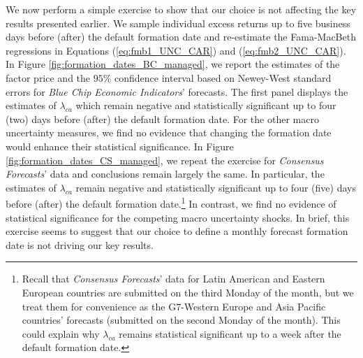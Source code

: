 We now perform a simple exercise to show that our choice is not affecting the key results presented earlier. We sample individual excess returns up to five business days before (after) the default formation date and re-estimate the Fama-MacBeth regressions in Equations (\ref{eq:fmb1_UNC_CAR}) and (\ref{eq:fmb2_UNC_CAR}). In Figure \ref{fig:formation_dates_BC_managed}, we report the estimates of the factor price and the $95\%$ confidence interval based on Newey-West standard errors for \emph{Blue Chip Economic Indicators}' forecasts. The first panel displays the estimates of $\lambda_{ca}$ which remain negative and statistically significant up to four (two) days before (after) the default formation date. For the other macro uncertainty measures, we find no evidence that changing the formation date would enhance their statistical significance. In Figure \ref{fig:formation_dates_CS_managed}, we repeat the exercise for \emph{Consensus Forecasts}' data and conclusions remain largely the same. In particular, the estimates of $\lambda_{ca}$ remain negative and statistically significant up to four (five) days before (after) the default formation date.\footnote{Recall that \emph{Consensus Forecasts}' data for Latin American and Eastern European countries are submitted on the third Monday of the month, but we treat them for convenience as the G7-Western Europe and Asia Pacific countries' forecasts (submitted on the second Monday of the month). This could explain why $\lambda_{ca}$ remains statistical significant up to a week after the default formation date.} In contrast, we find no evidence of statistical significance for the competing macro uncertainty shocks. In brief, this exercise seems to suggest that our choice to define a monthly forecast formation date is not driving our key results.

